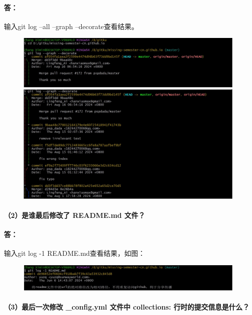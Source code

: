 \documentclass[a4paper, 12pt]{article}
\begin{document}
	\paragraph{答：}
	输入git log --all --graph --decorate查看结果。
	
	\begin{figure}[H]
		\centering
		\includegraphics[width=1\textwidth]{002.jpg}
		\includegraphics[width=1\textwidth]{003.jpg}
	\end{figure}
	
	\paragraph{（2）是谁最后修改了 README.md 文件？}
	
	\paragraph{答：}
	输入git log -1 README.md查看结果，如图：
	
	\begin{figure}[H]
	\centering
	\includegraphics[width=1\textwidth]{004.jpg}
	\end{figure}

	\paragraph{（3）最后一次修改 \_config.yml 文件中 collections: 行时的提交信息是什么？}
	
\end{document}
